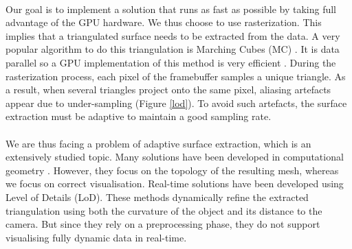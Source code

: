 \paragraph{}
Our goal is to implement a solution that runs as fast as possible by taking full advantage of the GPU hardware. 
We thus choose to use rasterization.
This implies that a triangulated surface needs to be extracted from the data.
A very popular algorithm to do this triangulation is Marching Cubes (MC) \cite{lorensen1987marching}. 
It is data parallel so a GPU implementation of this method is very efficient \cite{tatarchuk2007real}.
During the rasterization process, each pixel of the framebuffer samples a unique triangle.
As a result, when several triangles project onto the same pixel, aliasing artefacts appear due to under-sampling (Figure \ref{lod}). 
To avoid such artefacts, the surface extraction must be adaptive to maintain a good sampling rate.


\paragraph{} %
We are thus facing a problem of adaptive surface extraction, which is an extensively studied topic.
Many solutions have been developed in computational geometry \cite{shu1995adaptive,schaefer2004dual}.
However, they focus on the topology of the resulting mesh, whereas we focus on correct visualisation.
Real-time solutions have been developed using Level of Details (LoD). 
These methods dynamically refine the extracted triangulation using both the curvature of the object and its distance to the camera.
But since they rely on a preprocessing phase, they do not support visualising fully dynamic data in real-time.

